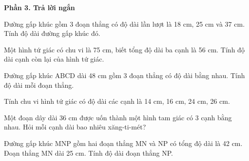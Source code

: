 \textbf{Phần 3. Trả lời ngắn}

\begin{ex} %
Đường gấp khúc gồm 3 đoạn thẳng có độ dài lần lượt là 18 cm, 25 cm và 37 cm. Tính độ dài đường gấp khúc đó.
\end{ex}

\begin{ex} %
Một hình tứ giác có chu vi là 75 cm, biết tổng độ dài ba cạnh là 56 cm. Tính độ dài cạnh còn lại của hình tứ giác.
\end{ex}

\begin{ex} %
Đường gấp khúc ABCD dài 48 cm gồm 3 đoạn thẳng có độ dài bằng nhau. Tính độ dài mỗi đoạn thẳng.
\end{ex}

\begin{ex} %
Tính chu vi hình tứ giác có độ dài các cạnh là 14 cm, 16 cm, 24 cm, 26 cm.
\end{ex}

\begin{ex} %
Một đoạn dây dài 36 cm được uốn thành một hình tam giác có 3 cạnh bằng nhau. Hỏi mỗi cạnh dài bao nhiêu xăng-ti-mét?
\end{ex}

\begin{ex} %
Đường gấp khúc MNP gồm hai đoạn thẳng MN và NP có tổng độ dài là 42 cm. Đoạn thẳng MN dài 25 cm. Tính độ dài đoạn thẳng NP.
\end{ex}

